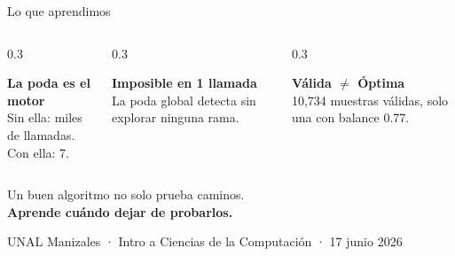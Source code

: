 \documentclass[aspectratio=169, 10pt]{beamer}
\begin{document}
{
\begin{frame}{Lo que aprendimos}
  \vspace{0.3cm}
  \begin{columns}[T]
    \begin{column}{0.3\textwidth}
      \begin{tarjetaverde}
        \begin{center}
          {\small\bfseries La poda es el motor}\\[4pt]
          {\footnotesize Sin ella: miles de llamadas.\\Con ella: 7.}
        \end{center}
      \end{tarjetaverde}
    \end{column}
    \begin{column}{0.3\textwidth}
      \begin{tarjetaverde}
        \begin{center}
          {\small\bfseries Imposible en 1 llamada}\\[4pt]
          {\footnotesize La poda global detecta sin explorar ninguna rama.}
        \end{center}
      \end{tarjetaverde}
    \end{column}
    \begin{column}{0.3\textwidth}
      \begin{tarjetaverde}
        \begin{center}
          {\small\bfseries Válida $\neq$ Óptima}\\[4pt]
          {\footnotesize 10,734 muestras válidas, solo una con balance 0.77.}
        \end{center}
      \end{tarjetaverde}
    \end{column}
  \end{columns}
\end{frame}
}


\begin{frame}
  \begin{center}
    \vspace{1.2cm}
    {\large Un buen algoritmo no solo prueba caminos.}\\[0.4cm]
    {\Large\bfseries\color{camarillo} Aprende cuándo dejar de probarlos.}
    \vspace{1.5cm}

    {\footnotesize\color{cgris}
      UNAL Manizales · Intro a Ciencias de la Computación · 17 junio 2026}
  \end{center}
\end{frame}
\end{document}
